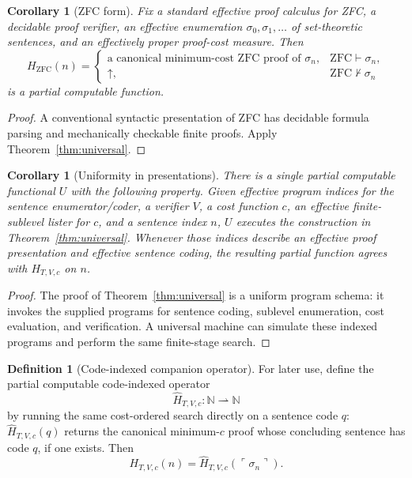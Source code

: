 \documentclass[11pt,oneside]{book}
\newtheorem{corollary}[theorem]{Corollary}
\theoremstyle{definition}
\newtheorem{definition}[theorem]{Definition}
\theoremstyle{remark}
\newcommand{\N}{\mathbb{N}}
\newcommand{\code}[1]{\ulcorner #1\urcorner}
\newcommand{\diverges}{\mathord{\uparrow}}
\begin{document}
\begin{corollary}[ZFC form]\label{cor:zfc}
Fix a standard effective proof calculus for ZFC, a decidable proof verifier, an effective enumeration $\sigma_0,\sigma_1,\ldots$ of set-theoretic sentences, and an effectively proper proof-cost measure. Then
\[
H_{\mathrm{ZFC}}(n)=
\begin{cases}
\text{a canonical minimum-cost ZFC proof of }\sigma_n,&\mathrm{ZFC}\vdash\sigma_n,\\
\diverges,&\mathrm{ZFC}\nvdash\sigma_n
\end{cases}
\]
is a partial computable function.
\end{corollary}
\begin{proof}
A conventional syntactic presentation of ZFC has decidable formula parsing and mechanically checkable finite proofs. Apply Theorem~\ref{thm:universal}.
\end{proof}

\begin{corollary}[Uniformity in presentations]\label{cor:uniform}
There is a single partial computable functional $U$ with the following property. Given effective program indices for the sentence enumerator/coder, a verifier $V$, a cost function $c$, an effective finite-sublevel lister for $c$, and a sentence index $n$, $U$ executes the construction in Theorem~\ref{thm:universal}. Whenever those indices describe an effective proof presentation and effective sentence coding, the resulting partial function agrees with $H_{T,V,c}$ on $n$.
\end{corollary}
\begin{proof}
The proof of Theorem~\ref{thm:universal} is a uniform program schema: it invokes the supplied programs for sentence coding, sublevel enumeration, cost evaluation, and verification. A universal machine can simulate these indexed programs and perform the same finite-stage search.
\end{proof}

\begin{definition}[Code-indexed companion operator]\label{def:codeindexed}
For later use, define the partial computable code-indexed operator
\[
\widehat H_{T,V,c}:\N\rightharpoonup\N
\]
by running the same cost-ordered search directly on a sentence code $q$: $\widehat H_{T,V,c}(q)$ returns the canonical minimum-$c$ proof whose concluding sentence has code $q$, if one exists. Then
\[
H_{T,V,c}(n)=\widehat H_{T,V,c}(\code{\sigma_n}).
\]
\end{definition}
\end{document}
